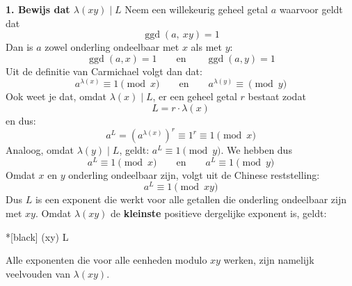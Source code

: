 \textbf{1. Bewijs dat $\lambda(xy) \mid L$}\newline
Neem een willekeurig geheel getal $a$ waarvoor geldt dat
\begin{equation*}
    \operatorname{ggd}(a,\ xy) = 1
\end{equation*}
Dan is $a$ zowel onderling ondeelbaar met $x$ als met $y$:
\begin{equation*}
    \operatorname{ggd}(a,x) = 1 \qquad \text{en} \qquad \operatorname{ggd}(a,y) = 1
\end{equation*}
Uit de definitie van Carmichael volgt dan dat:
\begin{equation*}
    a^{\lambda(x)} \equiv 1 \pmod x \qquad \text{en} \qquad a^{\lambda(y)} \equiv \pmod y
\end{equation*}
Ook weet je dat, omdat $\lambda(x) \mid L$, er een geheel getal $r$ bestaat zodat
\begin{equation*}
    L = r \cdot \lambda(x)
\end{equation*}
en dus:
\begin{equation*}
    a^L = \left(a^{\lambda(x)}\right)^r \equiv 1^r \equiv 1 \pmod x
\end{equation*}
Analoog, omdat $\lambda(y) \mid L$, geldt: $a^L \equiv 1 \pmod y$. We hebben dus
\begin{equation*}
    a^L \equiv 1 \pmod x \qquad \text{en} \qquad a^L \equiv 1 \pmod y
\end{equation*}
Omdat $x$ en $y$ onderling ondeelbaar zijn, volgt uit de Chinese reststelling:
\begin{equation*}
    a^L \equiv 1 \pmod {xy}
\end{equation*}
Dus $L$ is een exponent die werkt voor alle getallen die onderling ondeelbaar zijn met $xy$. Omdat $\lambda(xy)$ de \textbf{kleinste} positieve dergelijke exponent is, geldt:
\begin{equationbox}*[black]
    \lambda(xy) \mid L
\end{equationbox}
Alle exponenten die voor alle eenheden modulo $xy$ werken, zijn namelijk veelvouden van $\lambda(xy)$.

